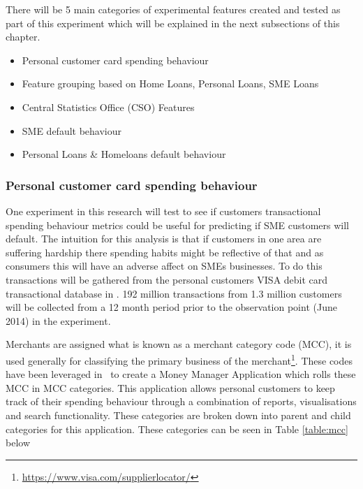 There will be 5 main categories of experimental features created and tested as part of this experiment which will be explained in the next subsections of this chapter. 

\begin{itemize}
	\item Personal customer card spending behaviour
	\item Feature grouping based on Home Loans, Personal Loans, SME Loans
	\item Central Statistics Office (CSO) Features
	\item SME default behaviour
	\item Personal Loans \& Homeloans default behaviour
\end{itemize}


\subsubsection{Personal customer card spending behaviour}
One experiment in this research will test to see if customers transactional spending behaviour metrics could be useful for predicting if SME customers will default. The intuition for this analysis is that if customers in one area are suffering hardship there spending habits might be reflective of that and as consumers this will have an adverse affect on SMEs businesses. To do this transactions will be gathered from the personal customers VISA debit card transactional database in \subjectname. 192 million transactions from 1.3 million customers  will be collected from a 12 month period prior to the observation point (June 2014) in the experiment. 

Merchants are assigned what is known as a merchant category code (MCC), it is used generally for classifying the primary business of the merchant\footnote{\url{https://www.visa.com/supplierlocator/}}. These codes have been leveraged in \subjectname\ to create a Money Manager Application which rolls these MCC in MCC categories. This application allows personal customers to keep track of their spending behaviour through a combination of reports, visualisations and search functionality. These categories are broken down into parent and child categories for this application. These categories can be seen in Table \ref{table:mcc} below

